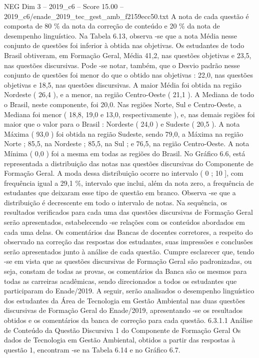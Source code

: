 \begin{textsample}{NEG Dim 3 – 2019\_c6 – Score 15.00 – 2019\_c6/enade\_2019\_tec\_gest\_amb\_f2159ecc50.txt}
A nota de cada questão é composta de 80 \% da nota da correção de conteúdo e 20 \% da nota de desempenho linguístico.
Na Tabela 6.13, observa -se que a nota Média nesse conjunto de questões foi inferior à obtida nas objetivas.
Os estudantes de todo Brasil obtiveram, em Formação Geral, Média 41,2, nas questões objetivas e 23,5, nas questões discursivas.
Pode -se notar, também, que o Desvio padrão nesse conjunto de questões foi menor do que o obtido nas objetivas : 22,0, nas questões objetivas e 18,5, nas questões discursivas.
A maior Média foi obtida na região Nordeste ( 26,4 ), e a menor, na região Centro-Oeste ( 21,1 ).
A Mediana de todo o Brasil, neste componente, foi 20,0.
Nas regiões Norte, Sul e Centro-Oeste, a Mediana foi menor ( 18,8, 19,0 e 13,0, respectivamente ), e, nas demais regiões foi maior que o valor para o Brasil : Nordeste ( 24,0 ) e Sudeste ( 20,5 ).
A nota Máxima ( 93,0 ) foi obtida na região Sudeste, sendo 79,0, a Máxima na região Norte ; 85,5, na Nordeste ; 85,5, na Sul ; e 76,5, na região Centro-Oeste.
A nota Mínima ( 0,0 ) foi a mesma em todas as regiões do Brasil.
No Gráfico 6.6, está representada a distribuição das notas nas questões discursivas do Componente de Formação Geral.
A moda dessa distribuição ocorre no intervalo ( 0 ; 10 ], com frequência igual a 29,1 \%, intervalo que inclui, além da nota zero, a frequência de estudantes que deixaram esse tipo de questão em branco.
Observa -se que a distribuição é decrescente em todo o intervalo de notas.
Na sequência, os resultados verificados para cada uma das questões discursivas de Formação Geral serão apresentados, estabelecendo -se relações com os conteúdos abordados em cada uma delas.
Os comentários das Bancas de docentes corretores, a respeito do observado na correção das respostas dos estudantes, suas impressões e conclusões serão apresentados junto à análise de cada questão.
Cumpre esclarecer que, tendo -se em vista que as questões discursivas de Formação Geral são padronizadas, ou seja, constam de todas as provas, os comentários da Banca são os mesmos para todas as carreiras acadêmicas, sendo direcionados a todos os estudantes que participaram do Enade/2019.
A seguir, serão analisados o desempenho linguístico dos estudantes da Área de Tecnologia em Gestão Ambiental nas duas questões discursivas de Formação Geral do Enade/2019, apresentando -se os resultados obtidos e os comentários da banca de correção para cada questão. 6.3.1.1 Análise de Conteúdo da Questão Discursiva 1 do Componente de Formação Geral Os dados de Tecnologia em Gestão Ambiental, obtidos a partir das respostas à questão 1, encontram -se na Tabela 6.14 e no Gráfico 6.7.

\end{textsample}

